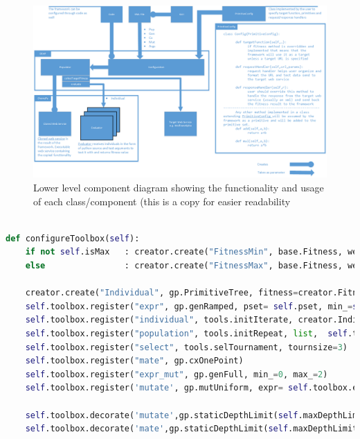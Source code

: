 \begin{landscape}
\begin{figure}[htp]
\centering
\includegraphics[scale=0.7]{Figures/Class.png}
\caption{Lower level component diagram showing the functionality and usage of each class/component (this is a copy for easier readability}
\label{fig:classdi}
\end{figure}
\end{landscape}

\begin{landscape}
\begin{lstlisting}[language=Python,caption={The core method in Configuration class that configures the DEAP framework},label={lst:config}]

def configureToolbox(self):
    if not self.isMax   : creator.create("FitnessMin", base.Fitness, weights=(-1.0,))
    else                : creator.create("FitnessMax", base.Fitness, weights=(-1.0,))

    creator.create("Individual", gp.PrimitiveTree, fitness=creator.FitnessMin, pset=self.pset)
    self.toolbox.register("expr", gp.genRamped, pset= self.pset, min_=self.depthInitialMin, max_=self.depthInitialMax)
    self.toolbox.register("individual", tools.initIterate, creator.Individual,  self.toolbox.expr)
    self.toolbox.register("population", tools.initRepeat, list,  self.toolbox.individual)
    self.toolbox.register("select", tools.selTournament, tournsize=3)
    self.toolbox.register("mate", gp.cxOnePoint)
    self.toolbox.register("expr_mut", gp.genFull, min_=0, max_=2)
    self.toolbox.register('mutate', gp.mutUniform, expr= self.toolbox.expr_mut)

	self.toolbox.decorate('mutate',gp.staticDepthLimit(self.maxDepthLimit))
    self.toolbox.decorate('mate',gp.staticDepthLimit(self.maxDepthLimit))
\end{lstlisting}
\end{landscape}	

